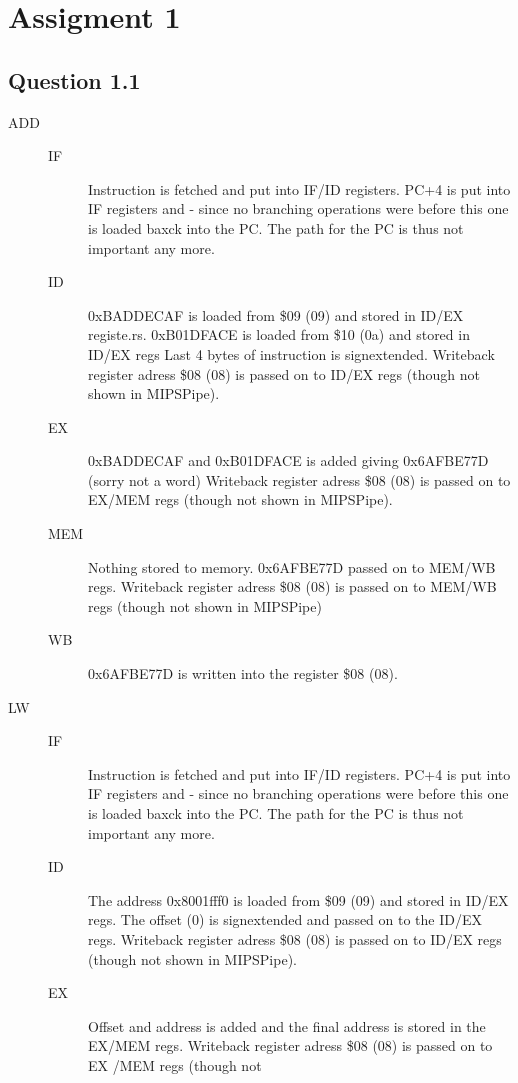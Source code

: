 \section{Assigment 1}
\subsection{Question 1.1}
\begin{description}
\item[ADD]
	\begin{description}
	\item[IF]
	 Instruction is fetched and put into IF/ID registers.
	 PC+4 is put into IF registers and - since no branching operations were before this one is loaded baxck into the PC. The path for the PC is thus not important any more.
	\item[ID]
	 0xBADDECAF is loaded from \$09 (09) and stored in ID/EX registe.rs.
	 0xB01DFACE is loaded from \$10 (0a) and stored in ID/EX regs
	 Last 4 bytes of instruction is signextended.
	 Writeback register adress \$08 (08) is passed on to ID/EX regs (though not
	 shown in MIPSPipe).
	\item[EX]
	 0xBADDECAF and 0xB01DFACE is added giving 0x6AFBE77D (sorry not a word)
	 Writeback register adress \$08 (08) is passed on to EX/MEM regs (though not
	 shown in MIPSPipe).
	\item[MEM]
	 Nothing stored to memory.
	 0x6AFBE77D passed on to MEM/WB regs.
	 Writeback register adress \$08 (08) is passed on to MEM/WB regs (though not
	 shown in MIPSPipe)
	\item[WB]
	 0x6AFBE77D is written into the register \$08 (08). 
	\end{description}	
\item[LW]
	\begin{description}
	\item[IF]
	 Instruction is fetched and put into IF/ID registers.
	 PC+4 is put into IF registers and - since no branching operations were before this one is loaded baxck into the PC. The path 	for the PC is thus not important any more.
	\item[ID]
	 The address 0x8001fff0 is loaded from \$09 (09) and stored in ID/EX regs.
	 The offset (0) is signextended and passed on to the ID/EX regs.
	 Writeback register adress \$08 (08) is passed on to ID/EX regs (though not
	 shown in MIPSPipe).
	\item[EX]
	 Offset and address is added and the final address is stored in the EX/MEM regs.
	 Writeback register adress \$08 (08) is passed on to EX /MEM regs (though not

\end{description}
\end{description}
